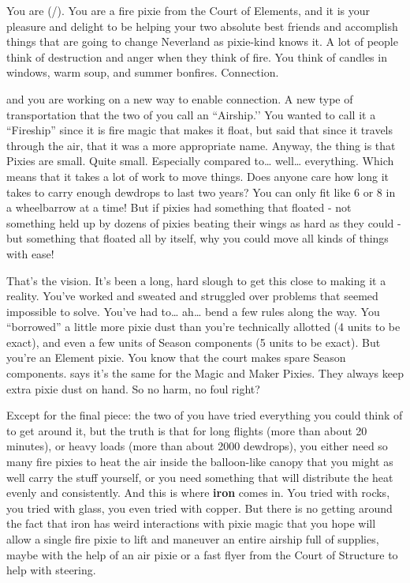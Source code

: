 \documentclass[char]{PP}
\begin{document}
\name{\cEAirship{}}

You are \cEAirship{} (\cEAirship{\They}/\cEAirship{\Them}). You are a fire pixie from the Court of Elements, and it is your pleasure and delight to be helping your two absolute best friends \cMAirship{} and \cFTitan{} accomplish things that are going to change Neverland as pixie-kind knows it. A lot of people think of destruction and anger when they think of fire. You think of candles in windows, warm soup, and summer bonfires. Connection.

\cMAirship{} and you are working on a new way to enable connection. A new type of transportation that the two of you call an ``Airship.'’ You wanted to call it a “Fireship” since it is fire magic that makes it float, but \cMAirship{} said that since it travels through the air, that it was a more appropriate name. Anyway, the thing is that Pixies are small. Quite small. Especially compared to… well… everything. Which means that it takes a lot of work to move things. Does anyone care how long it takes to carry enough dewdrops to last two years? You can only fit like 6 or 8 in a wheelbarrow at a time! But if pixies had something that floated - not something held up by dozens of pixies beating their wings as hard as they could - but something that floated all by itself, why you could move all kinds of things with ease!

That's the vision. It's been a long, hard slough to get this close to making it a reality. You've worked and sweated and struggled over problems that seemed impossible to solve. You've had to… ah… bend a few rules along the way. You “borrowed” a little more pixie dust than you're technically allotted (4 units to be exact), and even a few units of Season components (5 units to be exact). But you're an Element pixie. You know that the court makes spare Season components. \cMAirship{} says it's the same for the Magic and Maker Pixies. They always keep extra pixie dust on hand. So no harm, no foul right? 

Except for the final piece: the two of you have tried everything you could think of to get around it, but the truth is that for long flights (more than about 20 minutes), or heavy loads (more than about 2000 dewdrops), you either need so many fire pixies to heat the air inside the balloon-like canopy that you might as well carry the stuff yourself, or you need something that will distribute the heat evenly and consistently. And this is where \textbf{iron} comes in. You tried with rocks, you tried with glass, you even tried with copper. But there is no getting around the fact that iron has weird interactions with pixie magic that you hope will allow a single fire pixie to lift and maneuver an entire airship full of supplies, maybe with the help of an air pixie or a fast flyer from the Court of Structure to help with steering.
\end{document}
